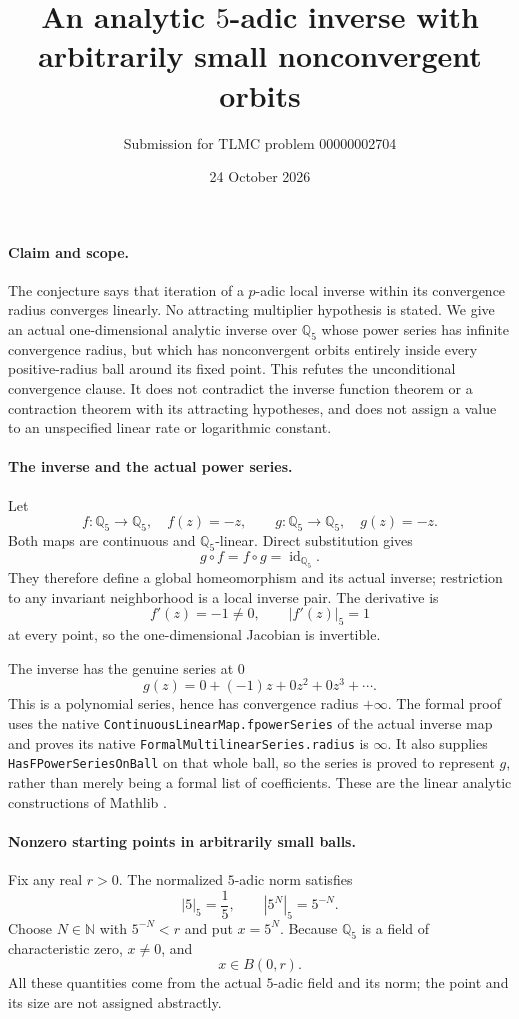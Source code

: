 \documentclass[11pt,a4paper]{article}
\title{An analytic $5$-adic inverse with arbitrarily small nonconvergent orbits}
\author{Submission for TLMC problem 00000002704}
\date{24 October 2026}
\newcommand{\Q}{\mathbb Q}
\newcommand{\N}{\mathbb N}
\begin{document}
\maketitle

\paragraph{Claim and scope.}
The conjecture says that iteration of a $p$-adic local inverse within its
convergence radius converges linearly. No attracting multiplier hypothesis
is stated. We give an actual one-dimensional analytic inverse over $\Q_5$
whose power series has infinite convergence radius, but which has
nonconvergent orbits entirely inside every positive-radius ball around its
fixed point. This refutes the unconditional convergence clause. It does not
contradict the inverse function theorem or a contraction theorem with its
attracting hypotheses, and does not assign a value to an unspecified
linear rate or logarithmic constant.

\paragraph{The inverse and the actual power series.}
Let
\[
f:\Q_5\longrightarrow\Q_5,\quad f(z)=-z,
\qquad g:\Q_5\longrightarrow\Q_5,\quad g(z)=-z.
\]
Both maps are continuous and $\Q_5$-linear. Direct substitution gives
\[
g\circ f=f\circ g=\operatorname{id}_{\Q_5}.
\]
They therefore define a global homeomorphism and its actual inverse;
restriction to any invariant neighborhood is a local inverse pair.
The derivative is
\[
f'(z)=-1\ne0,\qquad |f'(z)|_5=1
\]
at every point, so the one-dimensional Jacobian is invertible.

The inverse has the genuine series at $0$
\[
g(z)=0+(-1)z+0z^2+0z^3+\cdots.
\]
This is a polynomial series, hence has convergence radius $+\infty$.
The formal proof uses the native
\texttt{ContinuousLinearMap.fpowerSeries} of the actual inverse map and
proves its native \texttt{FormalMultilinearSeries.radius} is $\infty$.
It also supplies \texttt{HasFPowerSeriesOnBall} on that whole ball, so the
series is proved to represent $g$, rather than merely being a formal list of
coefficients. These are the linear analytic constructions of Mathlib
\cite{linear}.

\paragraph{Nonzero starting points in arbitrarily small balls.}
Fix any real $r>0$. The normalized $5$-adic norm satisfies
\[
|5|_5=\frac15,\qquad |5^N|_5=5^{-N}.
\]
Choose $N\in\N$ with $5^{-N}<r$ and put $x=5^N$.
Because $\Q_5$ is a field of characteristic zero, $x\ne0$, and
\[
x\in B(0,r).
\]
All these quantities come from the actual $5$-adic field and its norm;
the point and its size are not assigned abstractly.
\end{document}
